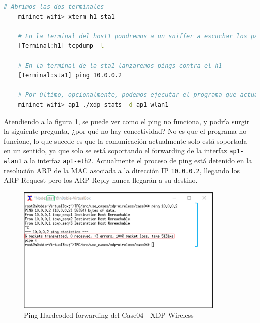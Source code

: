 \begin{lstlisting}[language= bash, style=Consola, caption={Comprobación del funcionamiento Hardcoded forwarding - Case04},label=code:case04_xdp_wifi_func1]
    # Abrimos las dos terminales
    mininet-wifi> xterm h1 sta1
    
    # En la terminal del host1 pondremos a un sniffer a escuchar los paquetes que nos lleguen.
    [Terminal:h1] tcpdump -l
    
    # En la terminal de la sta1 lanzaremos pings contra el h1
    [Terminal:sta1] ping 10.0.0.2
    
    # Por último, opcionalmente, podemos ejecutar el programa que actuaba como recolector de estadísticas sobre los códigos de retorno XDP
    mininet-wifi> ap1 ./xdp_stats -d ap1-wlan1
\end{lstlisting}

Atendiendo a la figura \ref{fig:case04_xdp_wifi_func1}, se puede ver como el ping \hspace{1mm} no funciona, y podría surgir la siguiente pregunta, ¿por qué no hay conectividad? No es que el programa no funcione, lo que sucede es que la comunicación actualmente solo está soportada en un sentido, ya que solo se está soportando el forwarding de la interfaz \texttt{ap1-wlan1} a la interfaz \texttt{ap1-eth2}. Actualmente el proceso de ping está detenido en la resolución ARP de la MAC asociada a la dirección IP \texttt{10.0.0.2}, llegando los ARP-Request pero los ARP-Reply nunca llegarán a su destino.\\
\par

\begin{figure}[ht!]
    \centering
    \includegraphics[width=10cm]{archivos/img/dev/xdp-wifi/case04/demo_case04_hard_1_edited.png}
    \caption{Ping Hardcoded forwarding del Case04 - XDP Wireless}
    \label{fig:case04_xdp_wifi_func1}
\end{figure}

